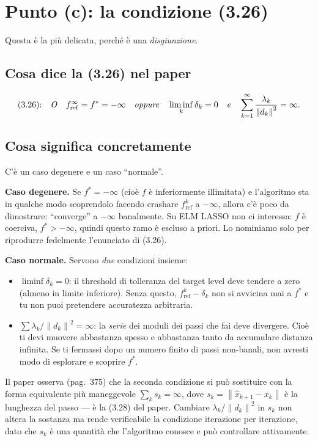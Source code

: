 \documentclass[11pt,a4paper]{article}
\newcommand{\norm}[1]{\left\|#1\right\|}
\theoremstyle{definition}
\begin{document}
\section{Punto (c): la condizione (3.26)}

Questa è la più delicata, perché è una \emph{disgiunzione}.

\subsection*{Cosa dice la (3.26) nel paper}

\[
\text{(3.26):} \quad \text{\emph{O}}\quad f^\infty_{\mathrm{ref}} = f^* = -\infty \quad\text{\emph{oppure}}\quad \liminf_k \delta_k = 0 \quad\text{\emph{e}}\quad \sum_{k=1}^\infty \frac{\lambda_k}{\norm{d_k}^2} = \infty.
\]

\subsection*{Cosa significa concretamente}

C'è un caso degenere e un caso ``normale''.

\textbf{Caso degenere.} Se $f^* = -\infty$ (cioè $f$ è inferiormente illimitata) e l'algoritmo sta in qualche modo scoprendolo facendo crashare $f^k_{\mathrm{ref}}$ a $-\infty$, allora c'è poco da dimostrare: ``converge'' a $-\infty$ banalmente. Su ELM LASSO non ci interessa: $f$ è coerciva, $f^* > -\infty$, quindi questo ramo è escluso a priori. Lo nominiamo solo per riprodurre fedelmente l'enunciato di (3.26).

\textbf{Caso normale.} Servono \emph{due} condizioni insieme:
\begin{itemize}[leftmargin=*]
\item $\liminf \delta_k = 0$: il threshold di tolleranza del target level deve tendere a zero (almeno in limite inferiore). Senza questo, $f^k_{\mathrm{ref}} - \delta_k$ non si avvicina mai a $f^*$ e tu non puoi pretendere accuratezza arbitraria.
\item $\sum \lambda_k/\norm{d_k}^2 = \infty$: la \emph{serie} dei moduli dei passi che fai deve divergere. Cioè ti devi muovere abbastanza spesso e abbastanza tanto da accumulare distanza infinita. Se ti fermassi dopo un numero finito di passi non-banali, non avresti modo di esplorare e scoprire $f^*$.
\end{itemize}

Il paper osserva (pag.\ 375) che la seconda condizione si può sostituire con la forma equivalente più maneggevole $\sum_k s_k = \infty$, dove $s_k = \norm{\hat x_{k+1} - x_k}$ è la lunghezza del passo --- è la (3.28) del paper. Cambiare $\lambda_k/\norm{d_k}^2$ in $s_k$ non altera la sostanza ma rende verificabile la condizione iterazione per iterazione, dato che $s_k$ è una quantità che l'algoritmo conosce e può controllare attivamente.
\end{document}
